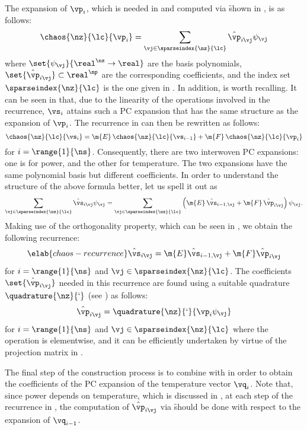 The expansion of $\vp_i$, which is needed in 
and computed via \f shown in , is as follows:
\[
  \chaos{\nz}{\lc}{\vp_i} = \sum_{\vj \in \sparseindex{\nz}{\lc}} \hat{\vp}_{i \vj} \psi_{\vj}
\]
where $\set{\psi_{\vj}}{\real^\nz \to \real}$ are the basis polynomials,
$\set{\hat{\vp}_{i \vj}} \subset \real^\np$ are the corresponding coefficients,
and the index set $\sparseindex{\nz}{\lc}$ is the one given in
. In addition,
 is worth recalling. It can be seen in
 that, due to the linearity of the operations
involved in the recurrence, $\vs_i$ attains such a \ac{PC} expansion that has
the same structure as the expansion of $\vp_i$. The recurrence in
 can then be rewritten as follows:
\[
  \chaos{\nz}{\lc}{\vs_i} = \m{E} \, \chaos{\nz}{\lc}{\vs_{i - 1}} + \m{F} \, \chaos{\nz}{\lc}{\vp_i}
\]
for $i = \range{1}{\ns}$. Consequently, there are two interwoven \ac{PC}
expansions: one is for power, and the other for temperature. The two expansions
have the same polynomial basis but different coefficients. In order to
understand the structure of the above formula better, let us spell it out as
\[
  \sum_{\vj \in \sparseindex{\nz}{\lc}} \hat{\vs}_{i \vj} \psi_{\vj} =
  \sum_{\vj \in \sparseindex{\nz}{\lc}} \left(\m{E} \, \hat{\vs}_{i - 1, \vj} + \m{F} \, \hat{\vp}_{i \vj}\right) \psi_{\vj}.
\]
Making use of the orthogonality property, which can be seen in
, we obtain the following recurrence:
\begin{equation} \elab{chaos-recurrence}
  \hat{\vs}_{i \vj} = \m{E} \hat{\vs}_{i - 1, \vj} + \m{F} \hat{\vp}_{i \vj}
\end{equation}
for $i = \range{1}{\ns}$ and $\vj \in \sparseindex{\nz}{\lc}$. The coefficients
$\set{\hat{\vp}_{i \vj}}$ needed in this recurrence are found using a suitable
quadrature $\quadrature{\nz}{\lq}$ (see ) as
follows:
\[
  \hat{\vp}_{i \vj} = \quadrature{\nz}{\lq}{\vp_i \psi_{\vj}}
\]
for $i = \range{1}{\ns}$ and $\vj \in \sparseindex{\nz}{\lc}$ where the
operation is elementwise, and it can be efficiently undertaken by virtue of the
projection matrix in .

The final step of the construction process is to combine 
with  in order to obtain the coefficients of the
\ac{PC} expansion of the temperature vector $\vq_i$. Note that, since power
depends on temperature, which is discussed in , at each step
of the recurrence in , the computation of $\hat{\vp}_{i
\vj}$ via \f should be done with respect to the expansion of $\vq_{i - 1}$.

